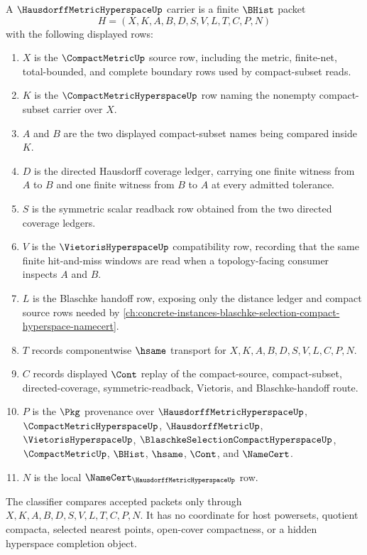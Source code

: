 \begin{definition}
\label{def:hausdorff-metric-hyperspace-carrier}
A $\HausdorffMetricHyperspaceUp$ carrier is a finite $\BHist$ packet
$$
H=(X,K,A,B,D,S,V,L,T,C,P,N)
$$
with the following displayed rows:
\begin{enumerate}
\item $X$ is the $\CompactMetricUp$ source row, including the metric, finite-net, total-bounded, and complete boundary rows used by compact-subset reads.
\item $K$ is the $\CompactMetricHyperspaceUp$ row naming the nonempty compact-subset carrier over $X$.
\item $A$ and $B$ are the two displayed compact-subset names being compared inside $K$.
\item $D$ is the directed Hausdorff coverage ledger, carrying one finite witness from $A$ to $B$ and one finite witness from $B$ to $A$ at every admitted tolerance.
\item $S$ is the symmetric scalar readback row obtained from the two directed coverage ledgers.
\item $V$ is the $\VietorisHyperspaceUp$ compatibility row, recording that the same finite hit-and-miss windows are read when a topology-facing consumer inspects $A$ and $B$.
\item $L$ is the Blaschke handoff row, exposing only the distance ledger and compact source rows needed by \autoref{ch:concrete-instances-blaschke-selection-compact-hyperspace-namecert}.
\item $T$ records componentwise $\hsame$ transport for $X,K,A,B,D,S,V,L,C,P,N$.
\item $C$ records displayed $\Cont$ replay of the compact-source, compact-subset, directed-coverage, symmetric-readback, Vietoris, and Blaschke-handoff route.
\item $P$ is the $\Pkg$ provenance over $\HausdorffMetricHyperspaceUp$, $\CompactMetricHyperspaceUp$, $\HausdorffMetricUp$, $\VietorisHyperspaceUp$, $\BlaschkeSelectionCompactHyperspaceUp$, $\CompactMetricUp$, $\BHist$, $\hsame$, $\Cont$, and $\NameCert$.
\item $N$ is the local $\NameCert_{\HausdorffMetricHyperspaceUp}$ row.
\end{enumerate}
The classifier compares accepted packets only through $X,K,A,B,D,S,V,L,T,C,P,N$. It has no coordinate for host powersets, quotient compacta, selected nearest points, open-cover compactness, or a hidden hyperspace completion object.
\end{definition}

